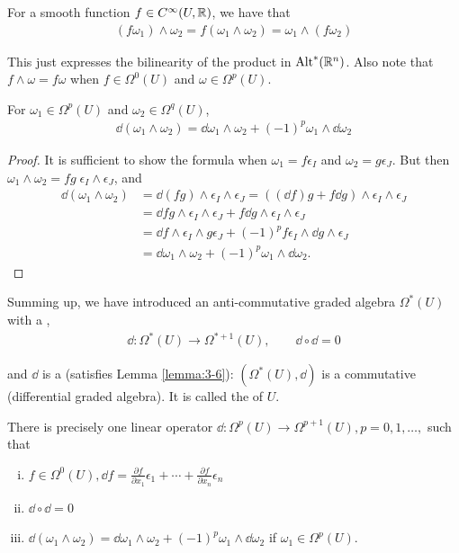 For a smooth function $f\in C^\infty(U, {\mathbb{R}})$, we have that
\begin{align*}
  (f\omega_1)\wedge\omega_2 = f(\omega_1\wedge\omega_2) = \omega_1\wedge(f\omega_2)
\end{align*}

This just expresses the bilinearity of the product in $\operatorname{Alt}^{*}({\mathbb{R}}^n)$. Also note that 
$f\wedge\omega = f\omega$ when $f\in\Omega^0(U)$ and $\omega\in\Omega^p(U)$.

\begin{lemma}\label{lemma:3-6}
For $\omega_1\in\Omega^p(U)$ and $\omega_2\in\Omega^q(U)$,
\begin{align*}
  \dd(\omega_1\wedge\omega_2) = \dd\omega_1\wedge\omega_2 + (-1)^p\omega_1\wedge\dd\omega_2
\end{align*}
\end{lemma}

\begin{proof}
  It is sufficient to show the formula when $\omega_1=f\epsilon_I$ and $\omega_2=g\epsilon_J$. But 
  then $\omega_1\wedge\omega_2 = fg\;\epsilon_I\wedge\epsilon_J$, and 
  \begin{align*}
    \dd(\omega_1\wedge\omega_2) 
    & = \dd(fg)\wedge\epsilon_{I}\wedge\epsilon_{J}=((\!\dd f)g+f\dd g)\wedge\epsilon_{I}\wedge\epsilon_{J} \\
    & = \dd fg\wedge\epsilon_{I}\wedge\epsilon_{J}+f\dd g\wedge\epsilon_{I}\wedge\epsilon_{J} \\
    & = \dd f\wedge\epsilon_{I}\wedge g\epsilon_{J}+(-1)^{p}f\epsilon_{I}\wedge \dd g\wedge\epsilon_{J} \\
    & = \dd\omega_{1}\wedge\omega_{2}+(-1)^{p}\omega_{1}\wedge \dd\omega_{2}. 
  \end{align*}
\end{proof}

Summing up, we have introduced an anti-commutative graded algebra $\Omega^*(U)$ with a ,
\begin{align*}
  \dd:\Omega^*(U)\to\Omega^{*+1}(U), \qquad \dd\circ\dd = 0
\end{align*}

and $\dd$ is a  (satisfies Lemma \ref{lemma:3-6}): $(\Omega^*(U), \dd)$ is a commutative 
(differential graded algebra). It is called the  of $U$.

\begin{theorem}\label{theorem:3-7}
There is precisely one linear operator $\dd:\Omega^p(U)\to\Omega^{p+1}(U), p = 0,1, \ldots,$ such that  
\begin{enumerate}[(i)]
  \item $f\in\Omega^0(U), \dd f = \frac{\partial f }{\partial x_1 }\epsilon_1 + \cdots + \frac{\partial f}{\partial x_n}\epsilon_n$
  \item $\dd\circ\dd = 0$
  \item $\dd(\omega_1\wedge\omega_2) = \dd\omega_1\wedge\omega_2 + (-1)^p\omega_1\wedge\dd\omega_2$ if $\omega_1\in\Omega^p(U)$.
\end{enumerate}
\end{theorem}

